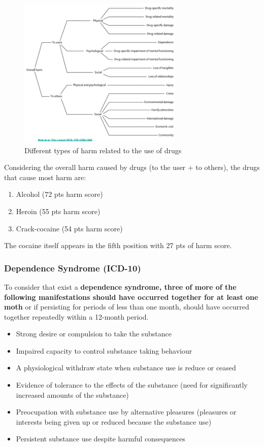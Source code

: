 \documentclass[12pt,article,oneside,a4paper]{memoir}
\begin{document}
\begin{figure}
  \centering
  \includegraphics[width=0.7\textwidth]{imgs/harm-drugs.png}
  \caption{Different types of harm related to the use of drugs}
  \label{fig:harm-drugs}
\end{figure}

Considering the overall harm caused by drugs (to the user + to others), the drugs that cause most harm are: 
\begin{enumerate}
\item Alcohol (72 pts harm score)
\item Heroin (55 pts harm score)
\item Crack-cocaine (54 pts harm score)
\end{enumerate}
The cocaine itself appears in the fifth position with 27 pts of harm score.

\subsubsection{Dependence Syndrome (ICD-10)} 
To consider that exist a \textbf{dependence syndrome, three of more of the following manifestations should have occurred together for at least one moth} or if persisting for periods of less than one month, should have occurred together repeatedly within a 12-month period.

\begin{itemize}
\item Strong desire or compulsion to take the substance
\item Impaired capacity to control substance taking behaviour
\item A physiological withdraw state when substance use is reduce or ceased
\item Evidence of tolerance to the effects of the substance (need for significantly increased amounts of the substance)
\item Preocupation with substance use by alternative pleasures (pleasures or interests being given up or reduced because the substance use)
\item Persistent substance use despite harmful consequences
\end{itemize}
\end{document}
